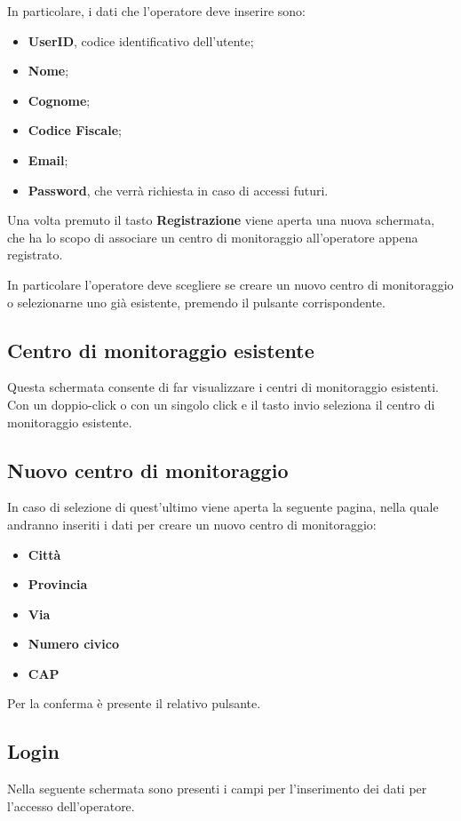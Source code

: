 In particolare, i dati che l'operatore deve inserire sono:
\begin{itemize}
	\item  \textbf{UserID}, codice identificativo dell'utente;
	\item  \textbf{Nome};
	\item  \textbf{Cognome};
	\item  \textbf{Codice Fiscale};
	\item  \textbf{Email};
	\item  \textbf{Password}, che verrà richiesta in caso di accessi futuri.
\end{itemize}
Una volta premuto il tasto \textbf{Registrazione} viene aperta una nuova schermata, che ha lo scopo di associare un centro di monitoraggio all'operatore appena registrato.

In particolare l'operatore deve scegliere se creare un nuovo centro di monitoraggio o selezionarne uno già esistente, premendo il pulsante corrispondente.
\subsection{Centro di monitoraggio esistente}
Questa schermata consente di far visualizzare i centri di monitoraggio esistenti.
Con un doppio-click o con un singolo click e il tasto invio seleziona il centro di monitoraggio esistente.
\subsection{Nuovo centro di monitoraggio} \label{NuovoCentroDiMonitoraggio}
In caso di selezione di quest'ultimo viene aperta la seguente pagina, nella quale andranno inseriti i dati per creare un nuovo centro di monitoraggio:
\begin{itemize}
	\item \textbf{Città}
	\item \textbf{Provincia}
	\item \textbf{Via}
	\item \textbf{Numero civico}
	\item \textbf{CAP}
\end{itemize}
Per la conferma è presente il relativo pulsante.
\subsection{Login}
Nella seguente schermata sono presenti i campi per l'inserimento dei dati per l'accesso dell'operatore.

